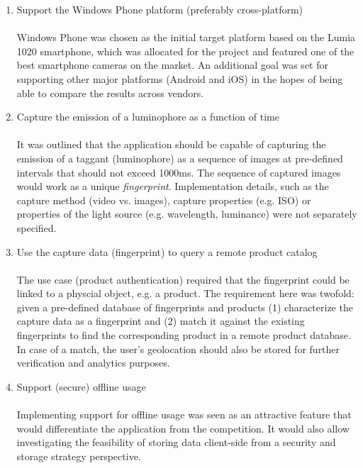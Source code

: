 \documentclass[thesis.tex]{subfiles}
\begin{document}
\begin{enumerate}[leftmargin=0.55in, label=\textbf{R\arabic*}]
	\item \label{R1} Support the Windows Phone platform (preferably cross-platform)\\ \\
	Windows Phone was chosen as the initial target platform based on the Lumia 1020 smartphone, which was allocated for the project and featured one of the best smartphone cameras on the market. An additional goal was set for supporting other major platforms (Android and iOS) in the hopes of being able to compare the results across vendors.

    \item \label{R2} Capture the emission of a luminophore as a function of time\\ \\
    It was outlined that the application should be capable of capturing the emission of a taggant (luminophore) as a sequence of images at pre-defined intervals that should not exceed 1000ms. The sequence of captured images would work as a unique \emph{fingerprint}. Implementation details, such as the capture method (video vs. images), capture properties (e.g. ISO) or properties of the light source (e.g. wavelength, luminance) were not separately specified.

    \item \label{R3} Use the capture data (fingerprint) to query a remote product catalog\\ \\
    The use case (product authentication) required that the fingerprint could be linked to a physcial object, e.g. a product. The requirement here was twofold: given a pre-defined database of fingerprints and products (1) characterize the capture data as a fingerprint and (2) match it against the existing fingerprints to find the corresponding product in a remote product database. In case of a match, the user's geolocation should also be stored for further verification and analytics purposes.

	\item \label{R4} Support (secure) offline usage\\ \\
	Implementing support for offline usage was seen as an attractive feature that would differentiate the application from the competition. It would also allow investigating the feasibility of storing data client-side from a security and storage strategy perspective.
\end{enumerate}
\end{document}
